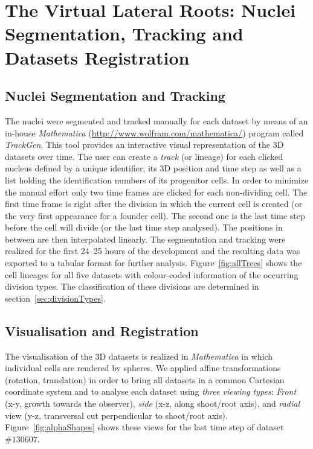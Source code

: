 \documentclass[11pt,a4paper, draft]{article}
\begin{document}
\section{The Virtual Lateral Roots: Nuclei Segmentation, Tracking and Datasets Registration}

\subsection{Nuclei Segmentation and Tracking}
\label{sec:segmentation}
\noindent
The nuclei were segmented and tracked manually for each dataset by means of an in-house \textit{Mathematica} (\href{http://www.wolfram.com/mathematica/}{http://www.wolfram.com/mathematica/}) program called \textit{TrackGen}. This tool provides an interactive visual representation of the 3D datasets over time. The user can create a \textit{track} (or lineage) for each clicked nucleus defined by a unique identifier, its 3D position and time step as well as a list holding the identification numbers of its progenitor cells. In order to minimize the manual effort only two time frames are clicked for each non-dividing cell. The first time frame is right after the division in which the current cell is created (or the very first appearance for a founder cell). The second one is the last time step before the cell will divide (or the last time step analysed). The positions in between are then interpolated linearly. The segmentation and tracking were realized for the first 24--25 hours of the development and the resulting data was exported to a tabular format for further analysis. Figure~\ref{fig:allTrees} shows the cell lineages for all five datasets with colour-coded information of the occurring division types. The classification of these divisions are determined in section~\ref{sec:divisionTypes}.

\subsection{Visualisation and Registration}
\noindent
The visualisation of the 3D datasets is realized in \textit{Mathematica} in which individual cells are rendered by spheres. We applied affine transformations (rotation, translation) in order to bring all datasets in a common Cartesian coordinate system and to analyse each dataset using \textit{three viewing types}: \textit{Front} (x-y, growth towards the observer), \textit{side} (x-z, along shoot/root axis),  and \textit{radial} view (y-z, transversal cut perpendicular to shoot/root axis). Figure~\ref{fig:alphaShapes} shows these views for the last time step of dataset $\# 130607$.
\end{document}
